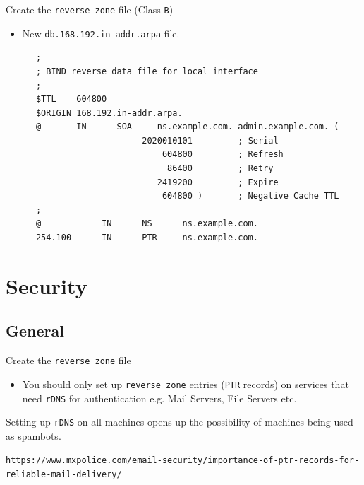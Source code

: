 \documentclass[xcolor=table,aspectratio=169]{beamer}
\begin{document}
\begin{frame}[fragile]{Create the \texttt{reverse zone} file (Class \texttt{B})}
  \begin{itemize}
    \item New \texttt{db.168.192.in-addr.arpa} file.
  \end{itemize}
  \begin{tcolorbox}
    \lstset{
      basicstyle=\tiny\ttfamily,
    }
    \begin{lstlisting}
      ;
      ; BIND reverse data file for local interface
      ;
      $TTL    604800
      $ORIGIN 168.192.in-addr.arpa.
      @       IN      SOA     ns.example.com. admin.example.com. (
                           2020010101         ; Serial
                               604800         ; Refresh
                                86400         ; Retry
                              2419200         ; Expire
                               604800 )       ; Negative Cache TTL
      ;
      @            IN      NS      ns.example.com.
      254.100      IN      PTR     ns.example.com.
          \end{lstlisting}
  \end{tcolorbox}
\end{frame}

\section{Security}
\subsection{General}
\begin{frame}{Create the \texttt{reverse zone} file}
  \begin{itemize}
    \item You should only set up \texttt{reverse zone} entries (\texttt{PTR} records) on services that need \texttt{rDNS} for authentication e.g. Mail Servers, File Servers etc. 
  \end{itemize}
  \begin{tcolorbox}[title={\textbf{NOTE:}}]
       \scriptsize Setting up \texttt{rDNS} on all machines opens up the possibility of machines being used as spambots.
  \end{tcolorbox}
  \begin{tcolorbox}[title={\textbf{INFO:}}]
    \begin{center}
      \tiny{\texttt{https://www.mxpolice.com/email-security/importance-of-ptr-records-for-reliable-mail-delivery/}}      
    \end{center}
\end{tcolorbox}
\end{frame}
\end{document}
